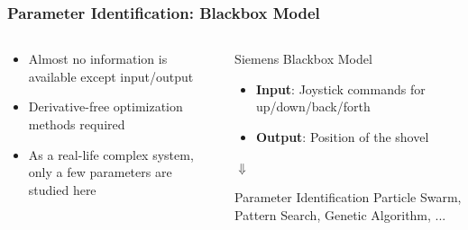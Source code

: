         
        
        
        
        
        
        
\begin{frame}        
    \frametitle{Parameter Identification: Blackbox Model}
    
    \begin{columns}[onlytextwidth]
        \begin{column}{0.5\textwidth}
        \begin{itemize}
            \item{Almost no information is available except input/output}
            \vspace{0.3cm}
            \item{Derivative-free optimization methods required}
            \vspace{0.3cm}
            \item{As a real-life complex system, only a few parameters are studied here}
        \end{itemize}
        \end{column}
    
    
    
    \begin{column}{0.45\textwidth}
            \begin{exampleblock}{Siemens Blackbox Model}
                \begin{itemize}
                
                \item{\textbf{Input}: Joystick commands for up/down/back/forth}
                \item{\textbf{Output}: Position of the shovel}
                \end{itemize}
            \end{exampleblock}
            
            $\Downarrow$
            
            \begin{exampleblock}{Parameter Identification}
            Particle Swarm, Pattern Search, Genetic Algorithm, ...
            \end{exampleblock}
        \end{column}
      \end{columns}
\end{frame}
